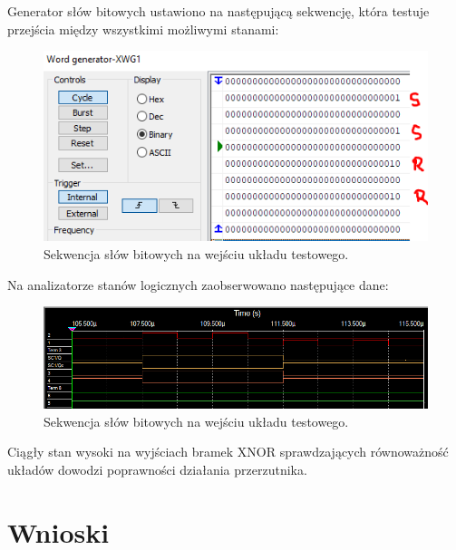 \documentclass[12pt,a4paper,openright]{mwrep}
\begin{document}
Generator słów bitowych ustawiono na następującą sekwencję, która testuje przejścia między wszystkimi
możliwymi stanami:

\begin{figure}[H]
    \centering
    \includegraphics[width=0.6\linewidth]{images/rs_xwg.PNG}
    \caption{Sekwencja słów bitowych na wejściu układu testowego.}
    \label{fig:rs_xwg}
\end{figure}

Na analizatorze stanów logicznych zaobserwowano następujące dane:

\begin{figure}[H]
    \centering
    \includegraphics[width=0.8\linewidth]{images/rs_plot.PNG}
    \caption{Sekwencja słów bitowych na wejściu układu testowego.}
    \label{fig:rs_plot}
\end{figure}

Ciągły stan wysoki na wyjściach bramek XNOR sprawdzających równoważność układów dowodzi poprawności działania
przerzutnika.

\section{Wnioski}
\end{document}
